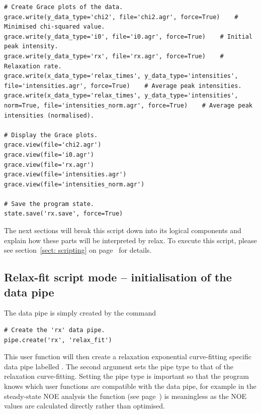 \begin{lstlisting}
# Create Grace plots of the data.
grace.write(y_data_type='chi2', file='chi2.agr', force=True)    # Minimised chi-squared value.
grace.write(y_data_type='i0', file='i0.agr', force=True)    # Initial peak intensity.
grace.write(y_data_type='rx', file='rx.agr', force=True)    # Relaxation rate.
grace.write(x_data_type='relax_times', y_data_type='intensities', file='intensities.agr', force=True)    # Average peak intensities.
grace.write(x_data_type='relax_times', y_data_type='intensities', norm=True, file='intensities_norm.agr', force=True)    # Average peak intensities (normalised).

# Display the Grace plots.
grace.view(file='chi2.agr')
grace.view(file='i0.agr')
grace.view(file='rx.agr')
grace.view(file='intensities.agr')
grace.view(file='intensities_norm.agr')

# Save the program state.
state.save('rx.save', force=True)
\end{lstlisting}

The next sections will break this script down into its logical components and explain how these parts will be interpreted by relax.
To execute this script, please see section~\ref{sect: scripting} on page~\pageref{sect: scripting} for details.



\subsection{Relax-fit script mode -- initialisation of the data pipe} \label{Rx initialisation}

The data pipe is simply created by the command

\begin{lstlisting}[firstnumber=3]
# Create the 'rx' data pipe.
pipe.create('rx', 'relax_fit')
\end{lstlisting}

This user function will then create a relaxation exponential curve-fitting specific data pipe labelled .
The second argument sets the pipe type to that of the relaxation curve-fitting.
Setting the pipe type is important so that the program knows which user functions are compatible with the data pipe, for example in the steady-state NOE analysis the function  (see page~\pageref{uf: minimise}) is meaningless as the NOE values are calculated directly rather than optimised.



